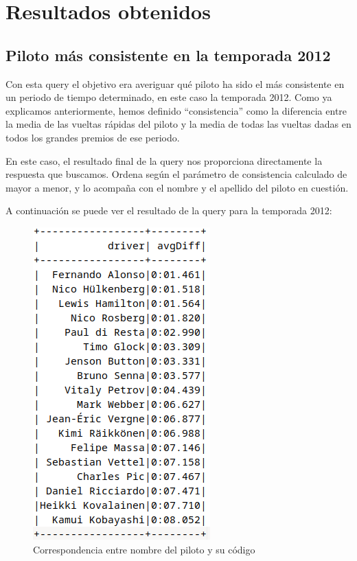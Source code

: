 \documentclass[12pt,twoside,titlepage]{report}
\newcommand{\quotes}[1]{``#1''}
\begin{document}
\chapter{Resultados obtenidos}
\label{sec:apendice2}

\section{Piloto más consistente en la temporada 2012}

Con esta query el objetivo era averiguar qué piloto ha sido el más consistente en un periodo de tiempo determinado, en este caso la temporada 2012. Como ya explicamos anteriormente, hemos definido \quotes{consistencia} como la diferencia entre la media de las vueltas rápidas del piloto y la media de todas las vueltas dadas en todos los grandes premios de ese periodo.

En este caso, el resultado final de la query nos proporciona directamente la respuesta que buscamos. Ordena según el parámetro de consistencia calculado de mayor a menor, y lo acompaña con el nombre y el apellido del piloto en cuestión.

A continuación se puede ver el resultado de la query para la temporada 2012:

\begin{figure}[H]
	\includegraphics[scale=0.4]{results/consistency/2012consistency.png}
	\centering
	\caption{Correspondencia entre nombre del piloto y su código}
	\label{fig:2012consistency}
	\centering
\end{figure}
\end{document}
